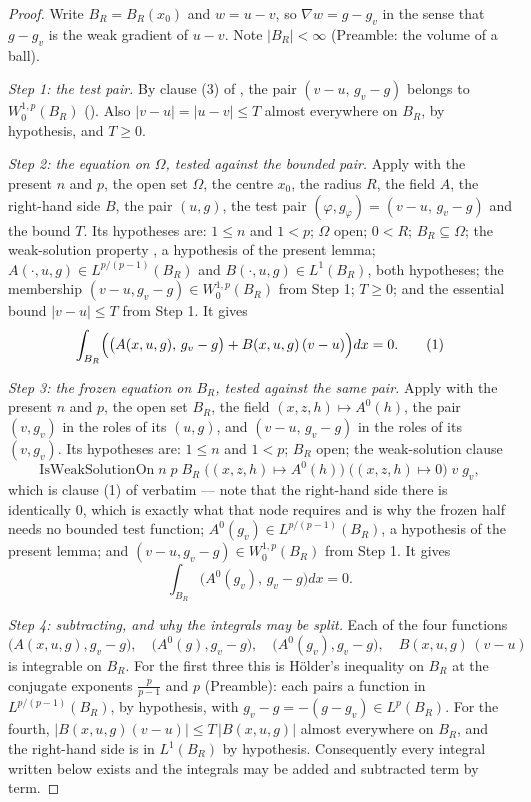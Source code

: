\begin{proof}
Write $B_R=B_R(x_0)$ and $w=u-v$, so $\nabla w=g-g_v$ in the sense that
$g-g_v$ is the weak gradient of $u-v$.  Note $|B_R|<\infty$ (Preamble: the
volume of a ball).

\emph{Step 1: the test pair.}  By clause (3) of ,
the pair $(v-u,\,g_v-g)$ belongs to $W^{1,p}_0(B_R)$
().  Also $|v-u|=|u-v|\le T$ almost everywhere on $B_R$,
by hypothesis, and $T\ge0$.

\emph{Step 2: the equation on $\Omega$, tested against the bounded pair.}
Apply  with the present $n$ and $p$, the
open set $\Omega$, the centre $x_0$, the radius $R$, the field $A$, the
right-hand side $B$, the pair $(u,g)$, the test pair
$(\varphi,g_\varphi)=(v-u,\,g_v-g)$ and the bound $T$.  Its hypotheses are:
$1\le n$ and $1<p$; $\Omega$ open; $0<R$; $B_R\subseteq\Omega$; the weak-solution
property , a hypothesis of the present lemma;
$A(\cdot,u,g)\in L^{p/(p-1)}(B_R)$ and $B(\cdot,u,g)\in L^1(B_R)$, both
hypotheses; the membership $(v-u,g_v-g)\in W^{1,p}_0(B_R)$ from Step 1; $T\ge0$;
and the essential bound $|v-u|\le T$ from Step 1.  It gives
\[
\int_{B_R}\Bigl(\bigl(A(x,u,g),\,g_v-g\bigr)+B(x,u,g)\,(v-u)\Bigr)dx=0 .
\tag{1}
\]

\emph{Step 3: the frozen equation on $B_R$, tested against the same pair.}
Apply  with the present $n$ and $p$, the open set
$B_R$, the field $(x,z,h)\mapsto A^0(h)$, the pair $(v,g_v)$ in the roles of its
$(u,g)$, and $(v-u,\,g_v-g)$ in the roles of its $(v,g_v)$.  Its hypotheses are:
$1\le n$ and $1<p$; $B_R$ open; the weak-solution clause
\[
\mathrm{IsWeakSolutionOn}\;n\;p\;B_R\;\bigl((x,z,h)\mapsto A^0(h)\bigr)\;
\bigl((x,z,h)\mapsto0\bigr)\;v\;g_v ,
\]
which is clause (1) of  verbatim --- note that the
right-hand side there is identically $0$, which is exactly what that node
requires and is why the frozen half needs no bounded test function;
$A^0(g_v)\in L^{p/(p-1)}(B_R)$, a hypothesis of the present lemma; and
$(v-u,g_v-g)\in W^{1,p}_0(B_R)$ from Step 1.  It gives
\[
\int_{B_R}\bigl(A^0(g_v),\,g_v-g\bigr)dx=0 .
\tag{2}
\]

\emph{Step 4: subtracting, and why the integrals may be split.}  Each of the
four functions
\[
\bigl(A(x,u,g),g_v-g\bigr),\quad
\bigl(A^0(g),g_v-g\bigr),\quad
\bigl(A^0(g_v),g_v-g\bigr),\quad
B(x,u,g)\,(v-u)
\]
is integrable on $B_R$.  For the first three this is H\"older's inequality on
$B_R$ at the conjugate exponents $\frac p{p-1}$ and $p$ (Preamble): each pairs
a function in $L^{p/(p-1)}(B_R)$, by hypothesis, with
$g_v-g=-(g-g_v)\in L^p(B_R)$.  For the fourth,
$|B(x,u,g)(v-u)|\le T\,|B(x,u,g)|$ almost everywhere on $B_R$, and the
right-hand side is in $L^1(B_R)$ by hypothesis.  Consequently every integral
written below exists and the integrals may be added and subtracted term by
term.


\end{proof}
